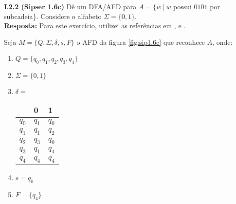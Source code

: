 
\noindent \textbf{L2.2 (Sipser 1.6c)} Dê um DFA/AFD para $A = \{w \ |\ w$ possui $0101$ por subcadeia\}. Considere o alfabeto $\Sigma = \{0, 1\}$.\\[3pt]
\textbf{Resposta: } Para este exercício, utilizei as referências em \cite{illinois3}, \cite{illinois2} e \cite{hopcroft2006}.

Seja $M = \{Q, \Sigma, \delta, s, F\}$ o AFD da figura \ref{fig:sip1.6c} que reconhece $A$, onde:
\begin{enumerate}[label=\textbf{\arabic*}]
    \item $Q = \{q_0, q_1, q_2, q_3, q_4\}$
    \item $\Sigma = \{0, 1\}$
    \item $\delta = $
        \begin{table}[!ht]
        \centering
        \begin{tabular}{l|l|l}
                & 0         & 1     \\ \hline
        $q_0$   & $q_1$     & $q_0$ \\
        $q_1$   & $q_1$     & $q_2$ \\
        $q_2$   & $q_3$     & $q_0$ \\
        $q_3$   & $q_1$     & $q_4$ \\
        $q_4$   & $q_4$     & $q_4$
        \end{tabular}
        \end{table}
    \item $s = q_0$
    \item $F = \{q_4\}$
\end{enumerate}

